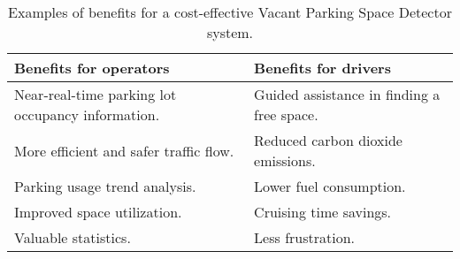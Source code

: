 \begin{table*}[ht]
\centering
{\normalsize
\hfill{}
  \begin{tabular}{| l | l |}
    \hline
    Benefits for operators & Benefits for drivers \\ \hline
    Near-real-time parking lot occupancy information. & Guided assistance in finding a free space.\\
    More efficient and safer traffic flow. & Reduced carbon dioxide emissions.\\
    Parking usage trend analysis. & Lower fuel consumption.\\
    Improved space utilization. & Cruising time savings.\\
    Valuable statistics. & Less frustration.\\ \hline
  \end{tabular}}
\hfill{}
\caption{Examples of benefits for a cost-effective Vacant Parking Space Detector system.}
\label{tb:project_benefits}
\end{table*} 